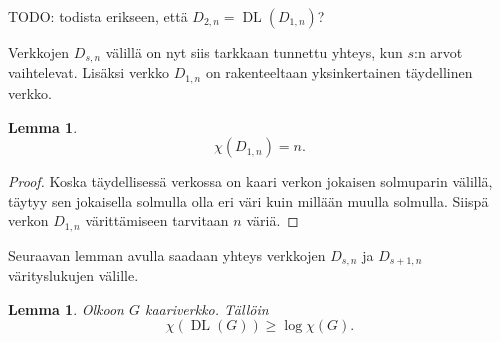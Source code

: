\documentclass[finnish]{tktltiki2}
\newtheorem{lem}[lau]{Lemma}
\theoremstyle{definition}
\theoremstyle{remark}
\DeclareMathOperator{\DL}{DL}
\newcommand{\Dsn}{D_{s,n}}
\newcommand{\Dssn}{D_{s+1,n}}
\begin{document}
TODO: todista erikseen, että $D_{2,n} = \DL(D_{1,n})$?

Verkkojen $\Dsn$ välillä on nyt siis tarkkaan tunnettu yhteys, kun $s$:n arvot
vaihtelevat. Lisäksi verkko $D_{1,n}$ on rakenteeltaan yksinkertainen
täydellinen verkko.

\begin{lem}
    \begin{equation*}
        \chi(D_{1,n}) = n.
    \end{equation*}
\end{lem}

\begin{proof}
    Koska täydellisessä verkossa on kaari verkon jokaisen solmuparin välillä,
    täytyy sen jokaisella solmulla olla eri väri kuin millään muulla solmulla.
    Siispä verkon $D_{1,n}$ värittämiseen tarvitaan $n$ väriä.
\end{proof}

Seuraavan lemman avulla saadaan yhteys verkkojen $\Dsn$ ja $\Dssn$
värityslukujen välille.

\newcommand{\DLG}{\DL(G)}

\begin{lem}
    Olkoon $G$ kaariverkko. Tällöin
    \begin{equation*}
        \chi(\DLG) \geq \log \chi(G).
    \end{equation*}
\end{lem}
\end{document}
